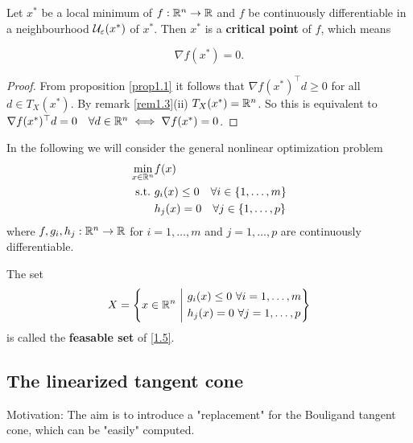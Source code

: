 \begin{theorem}\label{thm1.4}
    Let \(x^*\) be a local minimum of \(f : \mathbb{R}^n \to \mathbb{R}\) and \(f\) be continuously differentiable in a neighbourhood \(\mathcal{U}_\varepsilon(x^*)\) of \(x^*\). Then \(x^*\) is a \textbf{critical point} of \(f\), which means

    \begin{equation}
        \nabla f(x^*) = 0.
    \end{equation}
\end{theorem}
\begin{proof}
    From proposition \ref{prop1.1} it follows that \(\nabla f(x^*)^\top d \ge 0\) for all \(d \in T_X(x^*)\). By remark \ref{rem1.3}(ii) \(T_X(x^*) = \mathbb{R}^n\). So this is equivalent to \(\nabla f(x^*)^\top d = 0 \quad \forall
    d \in \mathbb{R}^n \iff \nabla f(x^*) = 0\).
\end{proof}

In the following we will consider the general nonlinear optimization problem
\begin{equation}\label{1.5}
    \begin{split}
        \min_{x \in \mathbb{R}^n} & f(x) \\
        \mathrm{s.t.} \ & g_i(x) \le 0 \quad \forall i \in \{1, \dots, m\} \\
        & h_j(x) = 0 \quad \forall j \in \{1, \dots, p\}
    \end{split}
\end{equation}
where \(f, g_i, h_j : \mathbb{R}^n \to \mathbb{R}\) for \(i = 1, \dots, m\) and \(j = 1, \dots, p\) are continuously differentiable.

The set
\begin{equation}\label{1.6}
    X = \left\{ x \in \mathbb{R}^n \ \middle| \ \begin{aligned} & g_i(x) \le 0 \ \forall i = 1, \dots, m \\ & h_j(x) = 0 \ \forall j = 1, \dots, p\end{aligned} \right\}
\end{equation}
is called the \textbf{feasable set} of \eqref{1.5}.


\subsection{The linearized tangent cone}

Motivation: The aim is to introduce a "replacement" for the Bouligand tangent cone, which can be "easily" computed.

